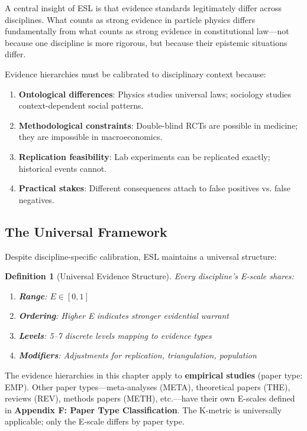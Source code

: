 \documentclass[11pt,a4paper]{article}
\newtheorem{definition}{Definition}[section]
\theoremstyle{remark}
\begin{document}
A central insight of ESL is that evidence standards legitimately differ across disciplines. What counts as strong evidence in particle physics differs fundamentally from what counts as strong evidence in constitutional law---not because one discipline is more rigorous, but because their epistemic situations differ.

\begin{keyinsight}[title={Discipline Specificity Principle}]
Evidence hierarchies must be calibrated to disciplinary context because:
\begin{enumerate}
    \item \textbf{Ontological differences}: Physics studies universal laws; sociology studies context-dependent social patterns.
    \item \textbf{Methodological constraints}: Double-blind RCTs are possible in medicine; they are impossible in macroeconomics.
    \item \textbf{Replication feasibility}: Lab experiments can be replicated exactly; historical events cannot.
    \item \textbf{Practical stakes}: Different consequences attach to false positives vs. false negatives.
\end{enumerate}
\end{keyinsight}

\subsection{The Universal Framework}

Despite discipline-specific calibration, ESL maintains a universal structure:

\begin{definition}[Universal Evidence Structure]
\label{def:universal-e}
Every discipline's E-scale shares:
\begin{enumerate}
    \item \textbf{Range}: $E \in [0, 1]$
    \item \textbf{Ordering}: Higher E indicates stronger evidential warrant
    \item \textbf{Levels}: 5--7 discrete levels mapping to evidence types
    \item \textbf{Modifiers}: Adjustments for replication, triangulation, population
\end{enumerate}
\end{definition}

\begin{warningbox}[title={Scope: Empirical Studies}]
The evidence hierarchies in this chapter apply to \textbf{empirical studies} (paper type: EMP). Other paper types---meta-analyses (META), theoretical papers (THE), reviews (REV), methods papers (METH), etc.---have their own E-scales defined in \textbf{Appendix F: Paper Type Classification}. The K-metric is universally applicable; only the E-scale differs by paper type.
\end{warningbox}
\end{document}
